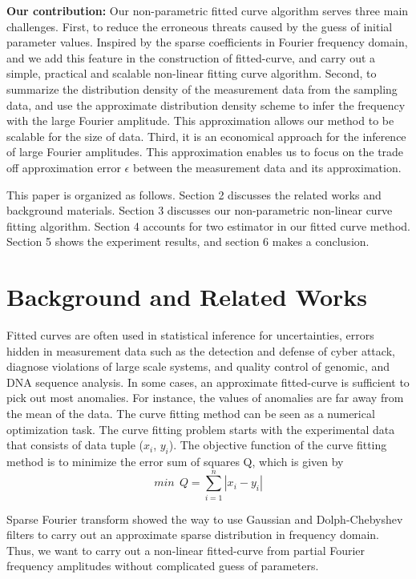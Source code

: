 \documentclass{sig-alternate}
\begin{document}
\textbf{Our contribution:} Our non-parametric fitted curve algorithm serves three main challenges. First, to reduce the erroneous threats caused by the guess of initial parameter values. Inspired by the sparse coefficients in Fourier frequency domain, and we add this feature in the construction of fitted-curve, and carry out a simple, practical and scalable non-linear fitting curve algorithm. Second, to summarize the distribution density of the measurement data from the sampling data, and use the approximate distribution density scheme to infer the frequency with the large Fourier amplitude. This approximation allows our method to be scalable for the size of data. Third, it is an economical approach for the inference of large Fourier amplitudes. This approximation enables us to focus on the trade off approximation error $\epsilon$ between the measurement data and its approximation.     

This paper is organized as follows. Section 2 discusses the related works and background materials. Section 3 discusses our non-parametric non-linear curve fitting algorithm. Section 4 accounts for two estimator in our fitted curve method. Section 5 shows the experiment results, and section 6 makes a conclusion. 

\section{Background and Related Works}
Fitted curves are often used in statistical inference for uncertainties, errors hidden in measurement data such as the detection and defense of cyber attack, diagnose violations of large scale systems, and quality control of genomic, and DNA sequence analysis. In some cases, an approximate fitted-curve is sufficient to pick out most anomalies. For instance, the values of anomalies are far away from the mean of the data. The curve fitting method can be seen as a numerical optimization task. The curve fitting problem starts with the experimental data that consists of data tuple ($x_i$, $y_i$). The objective function of the curve fitting method is to minimize the error sum of squares Q, which is given by  
\begin{displaymath}
min\ \ Q = \sum_{i=1}^n \left|x_i - y_i\right|
\end{displaymath}

Sparse Fourier transform\cite{Piotr:2014, Hassanieh:20121, Hassanieh:2012} showed the way to use Gaussian and Dolph-Chebyshev filters to carry out an approximate sparse distribution in frequency domain. 
Thus, we want to carry out a non-linear fitted-curve from partial Fourier frequency amplitudes without complicated guess of parameters.
 
\end{document}

